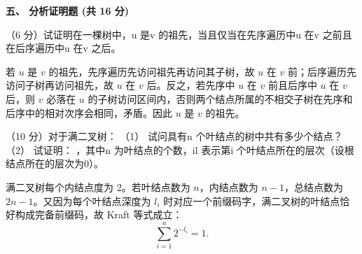 \textbf{五、 分析证明题 (共 16 分)}
\begin{question}
（6 分）试证明在一棵树中，u 是v 的祖先，当且仅当在先序遍历中u 在v 之前且在后序遍历中u 在v 之后。
\begin{solution}
若 $u$ 是 $v$ 的祖先，先序遍历先访问祖先再访问其子树，故 $u$ 在 $v$ 前；后序遍历先访问子树再访问祖先，故 $u$ 在 $v$ 后。反之，若先序中 $u$ 在 $v$ 前且后序中 $u$ 在 $v$ 后，则 $v$ 必落在 $u$ 的子树访问区间内，否则两个结点所属的不相交子树在先序和后序中的相对次序会相同，矛盾。因此 $u$ 是 $v$ 的祖先。
\end{solution}
\end{question}

\begin{question}
（10 分）对于满二叉树：
（1） 试问具有n 个叶结点的树中共有多少个结点？
（2） 试证明：
，其中n 为叶结点的个数，il 表示第i 个叶结点所在的层次（设根结点所在的层次为0）。
\begin{solution}
满二叉树每个内结点度为 2。若叶结点数为 $n$，内结点数为 $n-1$，总结点数为 $2n-1$。又因为每个叶结点深度为 $l_i$ 时对应一个前缀码字，满二叉树的叶结点恰好构成完备前缀码，故 Kraft 等式成立：
  \[
    \sum_{i=1}^n 2^{-l_i}=1.
  \]
\end{solution}
\end{question}
